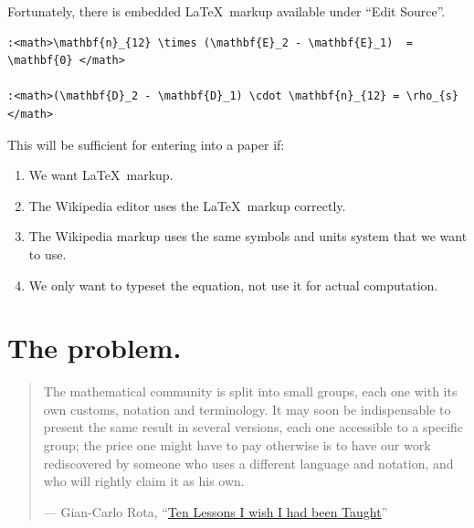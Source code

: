 \documentclass[12pt,letterpaper]{article}
\begin{document}
Fortunately,
there is embedded \LaTeX\ markup available under ``Edit Source''.

\begin{verbatim}
:<math>\mathbf{n}_{12} \times (\mathbf{E}_2 - \mathbf{E}_1)  = \mathbf{0} </math>

:<math>(\mathbf{D}_2 - \mathbf{D}_1) \cdot \mathbf{n}_{12} = \rho_{s} </math>
\end{verbatim}

This will be sufficient for entering into a paper if:
\begin{enumerate}
\item We want \LaTeX\ markup.
\item The Wikipedia editor uses the \LaTeX\ markup correctly.
\item The Wikipedia markup uses the same symbols and units system that we want to use.
\item We only want to typeset the equation, not use it for actual computation.
\end{enumerate}

\section{The problem.}

\begin{quote}
The mathematical community is split into small groups, each one with its own
customs, notation and terminology. It may soon be indispensable to present the
same result in several versions, each one accessible to a specific group; the
price one might have to pay otherwise is to have our work rediscovered by
someone who uses a different language and notation, and who will rightly claim
it as his own.

--- Gian-Carlo Rota,
``\href{http://alumni.media.mit.edu/~cahn/life/gian-carlo-rota-10-lessons.html#expository}
{Ten Lessons I wish I had been Taught}''
\end{quote}
\end{document}
